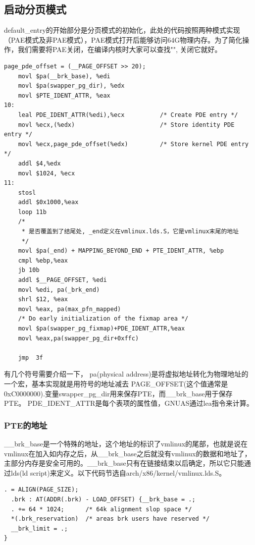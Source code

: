 \documentclass[b5paper,9pt,twoside,openany]{article}
\begin{document}
\subsection{启动分页模式}
default\_entry的开始部分是分页模式的初始化，此处的代码按照两种模式实现（PAE模式及非PAE模式），PAE模式打开后能够访问64G物理内存。为了简化操作，我们需要将PAE关闭，在编译内核时大家可以查找"", 关闭它就好。
 
\lstset{language=[Motorola68k]Assembler, escapechar=@,style=gnuasmcode}
\begin{lstlisting}
page_pde_offset = (__PAGE_OFFSET >> 20);
    movl $pa(__brk_base), %edi
    movl $pa(swapper_pg_dir), %edx
    movl $PTE_IDENT_ATTR, %eax
10:
    leal PDE_IDENT_ATTR(%edi),%ecx          /* Create PDE entry */
    movl %ecx,(%edx)                        /* Store identity PDE entry */
    movl %ecx,page_pde_offset(%edx)         /* Store kernel PDE entry */
    addl $4,%edx
    movl $1024, %ecx
11:
    stosl
    addl $0x1000,%eax
    loop 11b
    /*
     * 是否覆盖到了结尾处, _end定义在vmlinux.lds.S，它是vmlinux末尾的地址
     */
    movl $pa(_end) + MAPPING_BEYOND_END + PTE_IDENT_ATTR, %ebp
    cmpl %ebp,%eax
    jb 10b
    addl $__PAGE_OFFSET, %edi
    movl %edi, pa(_brk_end)
    shrl $12, %eax
    movl %eax, pa(max_pfn_mapped)
    /* Do early initialization of the fixmap area */
    movl $pa(swapper_pg_fixmap)+PDE_IDENT_ATTR,%eax
    movl %eax,pa(swapper_pg_dir+0xffc)

    jmp  3f
\end{lstlisting}
有几个符号需要介绍一下， pa(physical address)是将虚拟地址转化为物理地址的一个宏，基本实现就是用符号的地址减去 PAGE\_OFFSET(这个值通常是0xC0000000).变量swapper\_pg\_dir用来保存PTE，而\_\_brk\_base用于保存PTE。
PDE\_IDENT\_ATTR是每个表项的属性值，GNUAS通过lea指令来计算。

\subsubsection{PTE的地址}
\_\_brk\_base是一个特殊的地址，这个地址的标识了vmlinux的尾部，也就是说在vmlinux在加入如内存之后，从\_\_brk\_base之后就没有vmlinux的数据和地址了，主部分内存是安全可用的。\_\_brk\_base只有在链接结束以后确定，所以它只能通过lds(ld script)来定义。以下代码节选自arch/x86/kernel/vmlinux.lds.S。
\begin{lstlisting}
. = ALIGN(PAGE_SIZE);
  .brk : AT(ADDR(.brk) - LOAD_OFFSET) {__brk_base = .;
  . += 64 * 1024;      /* 64k alignment slop space */
  *(.brk_reservation)  /* areas brk users have reserved */
  __brk_limit = .;
}
\end{lstlisting}
\end{document}

